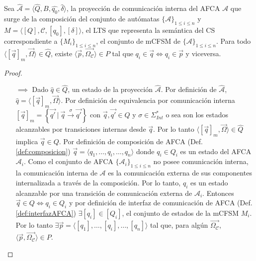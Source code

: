 \begin{lemma} Sea $\widehat{\mathcal{A}}=\langle \widehat{Q}, B, \widehat{q_0}, \widehat{\delta} \rangle$, la proyección de comunicación interna del AFCA $\mathcal{A}$ que surge de la composición del conjunto de autómatas  $\{\mathcal{A}\}_{1 \leq i \leq n}$  y $M= \langle [Q], \mathcal{C}, [q_0], [\delta] \rangle$, el LTS que representa la semántica del CS correspondiente a $\{M_i\}_{1 \leq i \leq n}$, el conjunto de mCFSM de $\{\mathcal{A}\}_{1 \leq i \leq n}$. Para todo $\langle [\overrightarrow{q}]_m, \overrightarrow{\Omega} \rangle \in \widehat{Q}$, existe $\langle \overrightarrow{p}, \overrightarrow{\Omega_{\mathcal{C}}} \rangle \in P$ tal que $q_i \in \overrightarrow{q} \iff q_i \in \overrightarrow{p}$ y viceversa. 
\end{lemma}
\begin{proof} 
\begin{itemize}
    \item[$\implies$] Dado $\widehat{q} \in \widehat{Q}$, un estado de la proyección $\widehat{\mathcal{A}}$. Por definición de $\widehat{\mathcal{A}}$, $\widehat{q}= \langle [\overrightarrow{q}]_m, \overrightarrow{\Omega} \rangle$. Por definición de equivalencia por comunicación interna $[\overrightarrow{q}]_m = \left\{\overrightarrow{q'}\ |\ \overrightarrow{q} \xrightarrow{\sigma}\overrightarrow{q'}\right\}$  con $\overrightarrow{q},\overrightarrow{q'} \in Q$ y $\sigma \in \Sigma_\mathit{Int}^*$ o sea son los estados alcanzables por transiciones internas desde $\overrightarrow{q}$. Por lo tanto $\langle [\overrightarrow{q}]_m, \overrightarrow{\Omega} \rangle \in \widehat{Q}$ implica $\overrightarrow{q} \in Q$. Por definición de composición de AFCA (Def.\ref{def:composicion}) $\overrightarrow{q} = \langle q_1, \ldots, q_i, \ldots, q_n \rangle$ donde $q_i \in Q_i$ es un estado del AFCA $\mathcal{A}_i$. Como el conjunto de AFCA $\{\mathcal{A}_i\}_{1 \leq i \leq n}$ no posee comunicación interna, la comunicación interna de $\mathcal{A}$ es la comunicación externa de sus componentes internalizada a través de la composición. Por lo tanto, $q_i$ es un estado alcanzable por una transición de comunicación externa de $\mathcal{A}_i$. Entonces $\overrightarrow{q} \in Q \iff q_i \in Q_i$ y por definición de interfaz de comunicación de AFCA (Def.\ref{def:interfazAFCA}) $\exists [q_i] \in [Q_i]$, el conjunto de estados de la mCFSM $M_i$. Por lo tanto $\exists \overrightarrow{p} = \langle [q_1], \ldots, [q_i], \ldots, [q_n] \rangle$ tal que, para algún $\overrightarrow{\Omega_\mathcal{C}}$, $\langle \overrightarrow{p}, \overrightarrow{\Omega_\mathcal{C}} \rangle \in P$.
    

\end{itemize}
\end{proof}
